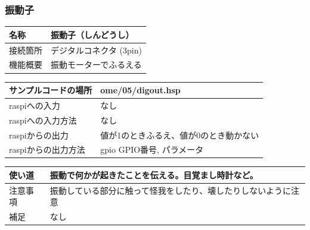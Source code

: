 \subsubsection{振動子}\label{vibrator}
\begin{table}[H]
	\begin{tabular}{|p{\colF}|p{\colG}|}	\hline
	名称 & 振動子（しんどうし）\\ \hline
	接続箇所 & デジタルコネクタ (3pin)\\ \hline
	機能概要 & 振動モーターでふるえる\\ \hline
  \end{tabular}
\end{table}

\begin{table}[H]
	\begin{tabular}{|p{\colF}|p{\colG}|}	\hline
	サンプルコードの場所 & ome/05/digout.hsp\\ \hline
	raspiへの入力 & なし\\ \hline
	raspiへの入力方法 & なし\\ \hline
	raspiからの出力 & 値が1のときふるえ、値が0のとき動かない\\ \hline
	raspiからの出力方法 & gpio GPIO番号, パラメータ\\ \hline
  \end{tabular}
\end{table}

\begin{table}[H]
	\begin{tabular}{|p{\colF}|p{\colG}|} \hline
	使い道 & 振動で何かが起きたことを伝える。目覚まし時計など。\\ \hline
	注意事項 & 振動している部分に触って怪我をしたり、壊したりしないように注意\\ \hline
	補足 & なし\\ \hline
  \end{tabular}
\end{table}

